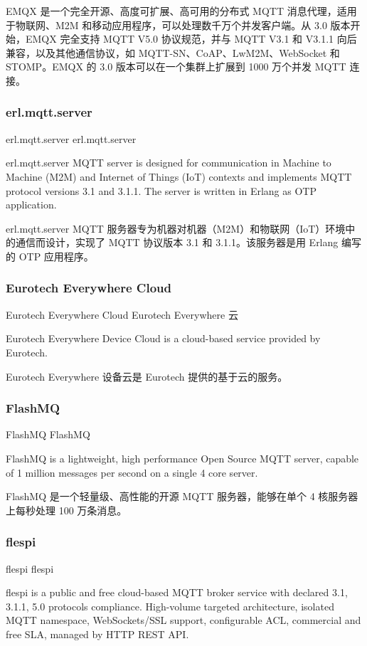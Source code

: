 \documentclass{ctexbook}
\begin{document}
EMQX 是一个完全开源、高度可扩展、高可用的分布式 MQTT 消息代理，适用于物联网、M2M 和移动应用程序，可以处理数千万个并发客户端。从 3.0 版本开始，EMQX 完全支持 MQTT V5.0 协议规范，并与 MQTT V3.1 和 V3.1.1 向后兼容，以及其他通信协议，如 MQTT-SN、CoAP、LwM2M、WebSocket 和 STOMP。EMQX 的 3.0 版本可以在一个集群上扩展到 1000 万个并发 MQTT 连接。

\subsubsection{erl.mqtt.server}
erl.mqtt.server erl.mqtt.server

erl.mqtt.server MQTT server is designed for communication in Machine to Machine (M2M) and Internet of Things (IoT) contexts and implements MQTT protocol versions 3.1 and 3.1.1. The server is written in Erlang as OTP application.

erl.mqtt.server MQTT 服务器专为机器对机器（M2M）和物联网（IoT）环境中的通信而设计，实现了 MQTT 协议版本 3.1 和 3.1.1。该服务器是用 Erlang 编写的 OTP 应用程序。

\subsubsection{Eurotech Everywhere Cloud}
Eurotech Everywhere Cloud Eurotech Everywhere 云

Eurotech Everywhere Device Cloud is a cloud-based service provided by Eurotech.

Eurotech Everywhere 设备云是 Eurotech 提供的基于云的服务。

\subsubsection{FlashMQ}
FlashMQ FlashMQ

FlashMQ is a lightweight, high performance Open Source MQTT server, capable of 1 million messages per second on a single 4 core server.

FlashMQ 是一个轻量级、高性能的开源 MQTT 服务器，能够在单个 4 核服务器上每秒处理 100 万条消息。

\subsubsection{flespi}
flespi flespi

flespi is a public and free cloud-based MQTT broker service with declared 3.1, 3.1.1, 5.0 protocols compliance. High-volume targeted architecture, isolated MQTT namespace, WebSockets/SSL support, configurable ACL, commercial and free SLA, managed by HTTP REST API.
\end{document}
